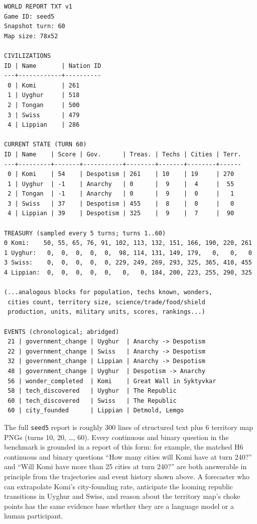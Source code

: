 \documentclass{article}
\begin{document}
{\footnotesize
\begin{verbatim}
WORLD REPORT TXT v1
Game ID: seed5
Snapshot turn: 60
Map size: 78x52

CIVILIZATIONS
ID | Name       | Nation ID
---+------------+----------
 0 | Komi       | 261
 1 | Uyghur     | 518
 2 | Tongan     | 500
 3 | Swiss      | 479
 4 | Lippian    | 286

CURRENT STATE (TURN 60)
ID | Name    | Score | Gov.      | Treas. | Techs | Cities | Terr.
---+---------+-------+-----------+--------+-------+--------+------
 0 | Komi    | 54    | Despotism | 261    | 10    | 19     | 270
 1 | Uyghur  | -1    | Anarchy   | 0      |  9    |  4     |  55
 2 | Tongan  | -1    | Anarchy   | 0      |  9    |  0     |   1
 3 | Swiss   | 37    | Despotism | 455    |  8    |  0     |   0
 4 | Lippian | 39    | Despotism | 325    |  9    |  7     |  90

TREASURY (sampled every 5 turns; turns 1..60)
0 Komi:    50, 55, 65, 76, 91, 102, 113, 132, 151, 166, 190, 220, 261
1 Uyghur:   0,  0,  0,  0,  0,  98, 114, 131, 149, 179,   0,   0,   0
3 Swiss:    0,  0,  0,  0,  0, 229, 249, 269, 293, 325, 365, 410, 455
4 Lippian:  0,  0,  0,  0,  0,   0,   0, 184, 200, 223, 255, 290, 325

(...analogous blocks for population, techs known, wonders,
 cities count, territory size, science/trade/food/shield
 production, units, military units, scores, rankings...)

EVENTS (chronological; abridged)
 21 | government_change | Uyghur  | Anarchy -> Despotism
 22 | government_change | Swiss   | Anarchy -> Despotism
 32 | government_change | Lippian | Anarchy -> Despotism
 48 | government_change | Uyghur  | Despotism -> Anarchy
 56 | wonder_completed  | Komi    | Great Wall in Syktyvkar
 58 | tech_discovered   | Uyghur  | The Republic
 60 | tech_discovered   | Swiss   | The Republic
 60 | city_founded      | Lippian | Detmold, Lemgo
\end{verbatim}
}

The full \texttt{seed5} report is roughly 300 lines of structured text plus 6 territory map PNGs (turns 10, 20, \ldots, 60). Every continuous and binary question in the benchmark is grounded in a report of this form: for example, the matched H6 continuous and binary questions ``How many cities will Komi have at turn 240?'' and ``Will Komi have more than 25 cities at turn 240?'' are both answerable in principle from the trajectories and event history shown above. A forecaster who can extrapolate Komi's city-founding rate, anticipate the looming republic transitions in Uyghur and Swiss, and reason about the territory map's choke points has the same evidence base whether they are a language model or a human participant.
\end{document}
